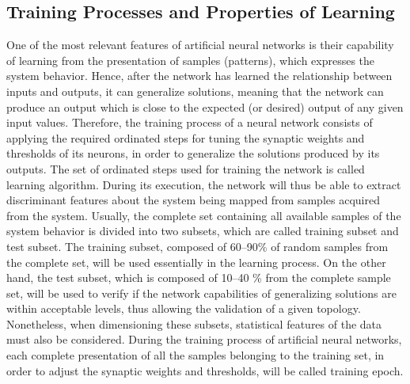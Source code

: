 \subsection{Training Processes and Properties of Learning}
One of the most relevant features of artificial neural networks is their capability of
learning from the presentation of samples (patterns), which expresses the system
behavior. Hence, after the network has learned the relationship between inputs and
outputs, it can generalize solutions, meaning that the network can produce an output
which is close to the expected (or desired) output of any given input values.
Therefore, the training process of a neural network consists of applying the
required ordinated steps for tuning the synaptic weights and thresholds of its
neurons, in order to generalize the solutions produced by its outputs.
The set of ordinated steps used for training the network is called learning
algorithm. During its execution, the network will thus be able to extract discriminant
features about the system being mapped from samples acquired from the
system.
Usually, the complete set containing all available samples of the system behavior
is divided into two subsets, which are called training subset and test subset. The
training subset, composed of 60–90\% of random samples from the complete set,
will be used essentially in the learning process. On the other hand, the test subset,
which is composed of 10–40 \% from the complete sample set, will be used to verify
if the network capabilities of generalizing solutions are within acceptable levels,
thus allowing the validation of a given topology. Nonetheless, when dimensioning these subsets, statistical features of the data must also be considered.
During the training process of artificial neural networks, each complete presentation
of all the samples belonging to the training set, in order to adjust the
synaptic weights and thresholds, will be called training epoch.
\newline
